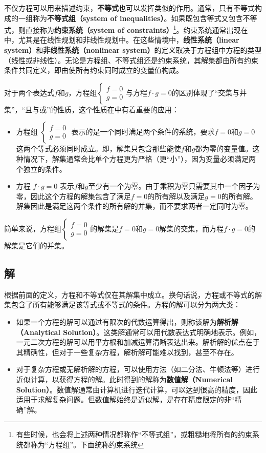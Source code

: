 不仅方程可以用来描述约束，\textbf{不等式}也可以发挥类似的作用。通常，只有不等式构成的一组称为\textbf{不等式组（system of inequalities）}。如果既包含等式又包含不等式，则直接称为\textbf{约束系统（system of constraints）}\footnote{有些时候，也会将上述两种情况都称作“不等式组”，或粗糙地将所有的约束系统都称为“方程组”。下面统称约束系统}。约束系统通常出现在中，尤其是在线性规划和非线性规划中。在这些情境中，\textbf{线性系统（linear system）}和\textbf{非线性系统（nonlinear system）}的定义取决于方程组中方程的类型（线性或非线性）。无论是方程组、不等式组还是约束系统，其解集都由所有约束条件共同定义，即由使所有约束同时成立的变量值构成。

对于两个表达式$f$和$g$，方程组$\begin{cases}f = 0 \\ g = 0\end{cases}$与方程$f \cdot g = 0$的区别体现了“交集与并集”，“且与或”的性质，这个性质在中有着重要的应用：

\begin{itemize}
\item 方程组 $\begin{cases}f = 0 \\ g = 0\end{cases}$ 表示的是一个同时满足两个条件的系统，要求$f = 0$和$g = 0$这两个等式必须同时成立。即，解集只包含那些能使$f$和$g$都为零的变量值。这种情况下，解集通常会比单个方程更为严格（更“小”），因为变量必须满足两个独立的条件。
\item 方程 $f \cdot g = 0$ 表示$f$和$g$至少有一个为零。由于乘积为零只需要其中一个因子为零，因此这个方程的解集包含了满足$f = 0$的所有解以及满足$g = 0$的所有解。解集因此是满足这两个条件的所有解的并集，而不要求两者一定同时为零。
\end{itemize}

简单来说，方程组$\begin{cases}f = 0 \\ g = 0\end{cases}$的解集是$f = 0$和$g = 0$解集的交集，而方程$f \cdot g = 0$的解集是它们的并集。

\subsection{解}

根据前面的定义，方程和不等式仅在其解集中成立。换句话说，方程或不等式的解集包含了所有能够满足该等式或不等式的条件。方程的解可以分为两大类：

\begin{itemize}
\item 如果一个方程的解可以通过有限次的代数运算得出，则称该解为\textbf{解析解（Analytical Solution）}。这类解通常可以用代数表达式明确地表示。例如，一元二次方程的解可以用平方根和加减运算清晰表达出来。解析解的优点在于其精确性，但对于一些复杂方程，解析解可能难以找到，甚至不存在。
\item 对于复杂方程或无解析解的方程，可以使用方法（如二分法、牛顿法等）进行近似计算，以获得方程的解。此时得到的解称为\textbf{数值解（Numerical Solution）}。数值解通常由计算机进行迭代计算，可以达到很高的精度，因此适用于求解复杂问题。但数值解始终是近似解，是存在精度限定的非“精确”解。
\end{itemize}

